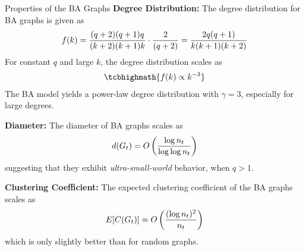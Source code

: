\begin{frame}{Properties of the BA Graphs}
\small
\smallskip
{\bf Degree Distribution:}
The degree distribution for BA graphs is given as
\begin{align*}
f(k) = {(q+2)(q+1)q \over (k+2)(k+1)k} \cdot {2 \over
(q+2)} = {2q(q+1) \over k(k+1)(k+2)}
\end{align*}
For constant $q$ and large $k$, the degree
distribution scales as
\begin{align*}
\tcbhighmath{
    f(k) \propto k^{-3}
}
\end{align*}
The BA model yields a power-law degree
distribution with $\gamma=3$, especially for large degrees.

\medskip
{\bf Diameter:}
The diameter of BA graphs scales as
$$d(G_t) = O\left( {\log n_t \over \log \log n_t} \right)$$
suggesting that they exhibit {\em ultra-small-world} behavior,
when $q>1$.

\medskip
{\bf Clustering Coefficient:}
The expected clustering coeff\/{i}cient of the BA graphs
scales as
$$E[C(G_t)] = O\left( {(\log n_t)^2 \over n_t} \right) $$
which is only slightly better than for random graphs.
\end{frame}



